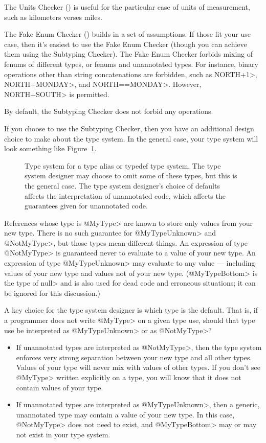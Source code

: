 The Units Checker () is useful for the
particular case of units of measurement, such as kilometers verses miles.

The Fake Enum Checker ()
builds in a set of assumptions.  If those fit your
use case, then it's easiest to use the Fake Enum Checker (though you can
achieve them using the Subtyping Checker).  The Fake Enum Checker forbids
mixing of fenums of different types, or fenums and unannotated types.  For
instance, binary operations other than string concatenations are forbidden,
such as \<NORTH+1>, \<NORTH+MONDAY>, and \<NORTH==MONDAY>.  However,
\<NORTH+SOUTH> is permitted.

By default, the Subtyping Checker does not forbid any operations.

If you choose to use the Subtyping Checker, then you have an additional
design choice to make about the type system.  In the general case, your
type system will look something like Figure~\ref{fig-typedef-hierarchy}.

\begin{figure}
\caption{Type system for a type alias or typedef type system.
  The type system designer may choose to omit some of these types, but
  this is the general case.
  The type system designer's choice of defaults affects the interpretation
  of unannotated code, which affects the guarantees given for unannotated code.
  \label{fig-typedef-hierarchy}}
\end{figure}

References whose type is \<@MyType> are known to store only values from
your new type.  There is no such guarantee for \<@MyTypeUnknown> and
\<@NotMyType>, but those types mean different things.  An expression of type
\<@NotMyType> is guaranteed never to evaluate to a value of your new type.
An expression of type \<@MyTypeUnknown> may evaluate to any value ---
including values of your new type and values not of your new type.
(\<@MyTypeBottom> is the type of \<null> and is also used for dead code and
erroneous situations; it can be ignored for this
discussion.)

A key choice for the type system designer is which type is the default.
That is, if a programmer does not write \<@MyType> on a given type use,
should that type use be interpreted as \<@MyTypeUnknown> or as
\<@NotMyType>?

\begin{itemize}
\item
If unannotated types are interpreted as \<@NotMyType>, then the type system
enforces very strong separation between your new type and all other types.
Values of your type will never mix with values of other types.  If you
don't see \<@MyType> written explicitly on a type, you will know that
it does not contain values of your type.

\item
If unannotated types are interpreted as \<@MyTypeUnknown>, then
a generic, unannotated type may contain a value of your new type.
In this case, \<@NotMyType> does not need to exist, and \<@MyTypeBottom>
may or may not exist in your type system.
\end{itemize}

